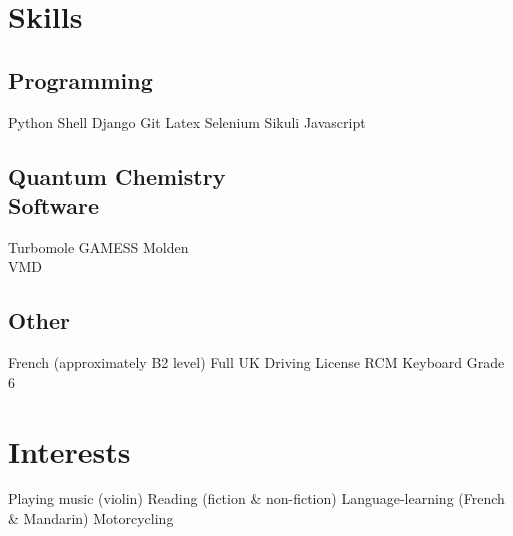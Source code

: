 \documentclass[letterpaper]{deedy-resume-openfont} %
\begin{document}
\begin{minipage}[t]{0.33\textwidth}
\sectionspace %


\section{Skills}

\subsection{Programming}

Python \textbullet{} Shell \textbullet{} Django \textbullet{} Git \textbullet{} Latex \textbullet{} Selenium \textbullet{} Sikuli \textbullet{} Javascript

\sectionspace %

\subsection[]{Quantum Chemistry \\ Software}

Turbomole \textbullet{} GAMESS \textbullet{} Molden \\
\textbullet{} VMD 

\sectionspace %

\subsection[]{Other}

French (approximately B2 level) \textbullet{} Full UK Driving License \textbullet{} RCM Keyboard Grade 6

\sectionspace %

\section{Interests}

Playing music (violin) \textbullet{} Reading (fiction \& non-fiction) \textbullet{} Language-learning (French \& Mandarin) \textbullet{} Motorcycling \\


\end{minipage} %
\end{document}
